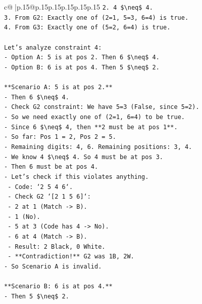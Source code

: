 \documentclass{article}
\begin{document}
{\begin{supertabular}{c@{$\;$}|p{.15\linewidth}@{}p{.15\linewidth}p{.15\linewidth}p{.15\linewidth}p{.15\linewidth}p{.15\linewidth}}
{{{\texttt{2.  4 \$\textbackslash{}neq\$ 4.} \\
\texttt{3.  From G2: Exactly one of (2=1, 5=3, 6=4) is true.} \\
\texttt{4.  From G3: Exactly one of (5=2, 6=4) is true.} \\
\\ 
\texttt{Let's analyze constraint 4:} \\
\texttt{{-} Option A: 5 is at pos 2. Then 6 \$\textbackslash{}neq\$ 4.} \\
\texttt{{-} Option B: 6 is at pos 4. Then 5 \$\textbackslash{}neq\$ 2.} \\
\\ 
\texttt{**Scenario A: 5 is at pos 2.**} \\
\texttt{{-} Then 6 \$\textbackslash{}neq\$ 4.} \\
\texttt{{-} Check G2 constraint: We have 5=3 (False, since 5=2).} \\
\texttt{{-} So we need exactly one of (2=1, 6=4) to be true.} \\
\texttt{{-} Since 6 \$\textbackslash{}neq\$ 4, then **2 must be at pos 1**.} \\
\texttt{{-} So far: Pos 1 = 2, Pos 2 = 5.} \\
\texttt{{-} Remaining digits: 4, 6. Remaining positions: 3, 4.} \\
\texttt{{-} We know 4 \$\textbackslash{}neq\$ 4. So 4 must be at pos 3.} \\
\texttt{{-} Then 6 must be at pos 4.} \\
\texttt{{-} Let's check if this violates anything.} \\
\texttt{    {-} Code: `2 5 4 6`.} \\
\texttt{    {-} Check G2 `{[}2 1 5 6{]}`:} \\
\texttt{        {-} 2 at 1 (Match {-}> B).} \\
\texttt{        {-} 1 (No).} \\
\texttt{        {-} 5 at 3 (Code has 4 {-}> No).} \\
\texttt{        {-} 6 at 4 (Match {-}> B).} \\
\texttt{        {-} Result: 2 Black, 0 White.} \\
\texttt{        {-} **Contradiction!** G2 was 1B, 2W.} \\
\texttt{{-} So Scenario A is invalid.} \\
\\ 
\texttt{**Scenario B: 6 is at pos 4.**} \\
\texttt{{-} Then 5 \$\textbackslash{}neq\$ 2.} \\
}}}
\end{supertabular}}
\end{document}
